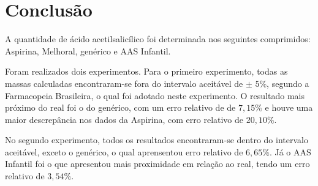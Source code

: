 \chapter{Conclusão}

A quantidade de ácido acetilsalicílico foi determinada nos seguintes comprimidos: Aspirina\R, 
Melhoral\R, genérico e AAS Infantil.

Foram realizados dois experimentos. Para o primeiro experimento, todas as massas calculadas
encontraram-se fora do intervalo aceitável de $\pm$ 5\%, segundo a Farmacopeia Brasileira, o qual
foi adotado neste experimento. O resultado mais próximo do real foi o do genérico, com um erro
relativo de de $7,15\%$ e houve uma maior descrepância nos dados da Aspirina\R, com erro relativo
de $20,10\%$.

No segundo experimento, todos os resultados encontraram-se dentro do intervalo aceitável, exceto o
genérico, o qual aprensentou erro relativo de $6,65\%$. Já o AAS Infantil foi o que apresentou mais
proximidade em relação ao real, tendo um erro relativo de $3,54\%$.

